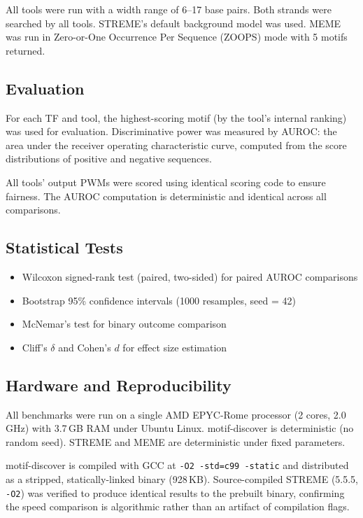 All tools were run with a width range of 6--17 base pairs. Both strands were searched by all tools. STREME's default background model was used. MEME was run in Zero-or-One Occurrence Per Sequence (ZOOPS) mode with 5 motifs returned.

\subsection{Evaluation}

For each TF and tool, the highest-scoring motif (by the tool's internal ranking) was used for evaluation. Discriminative power was measured by AUROC: the area under the receiver operating characteristic curve, computed from the score distributions of positive and negative sequences.

All tools' output PWMs were scored using identical scoring code to ensure fairness. The AUROC computation is deterministic and identical across all comparisons.

\subsection{Statistical Tests}

\begin{itemize}
    \item Wilcoxon signed-rank test (paired, two-sided) for paired AUROC comparisons
    \item Bootstrap 95\% confidence intervals (1000 resamples, seed = 42)
    \item McNemar's test for binary outcome comparison
    \item Cliff's $\delta$ and Cohen's $d$ for effect size estimation
\end{itemize}

\subsection{Hardware and Reproducibility}

All benchmarks were run on a single AMD EPYC-Rome processor (2 cores, 2.0\,GHz) with 3.7\,GB RAM under Ubuntu Linux. motif-discover is deterministic (no random seed). STREME and MEME are deterministic under fixed parameters.

motif-discover is compiled with GCC at \texttt{-O2 -std=c99 -static} and distributed as a stripped, statically-linked binary (928\,KB). Source-compiled STREME (5.5.5, \texttt{-O2}) was verified to produce identical results to the prebuilt binary, confirming the speed comparison is algorithmic rather than an artifact of compilation flags.
